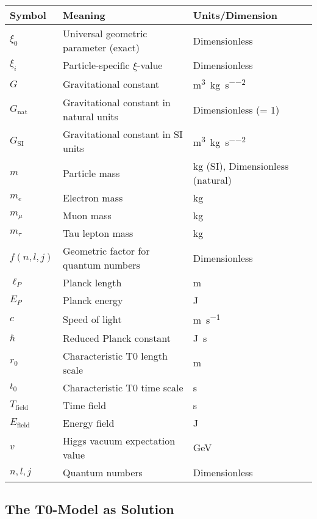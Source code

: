 \documentclass[12pt,a4paper]{article}
\newcommand{\xifunc}{f(n,l,j)}
\newcommand{\Gsi}{G_{\text{SI}}}
\newcommand{\Gnat}{G_{\text{nat}}}
\theoremstyle{definition}
\begin{document}
	\begin{center}
		\begin{tabular}{lll}
			\toprule
			\textbf{Symbol} & \textbf{Meaning} & \textbf{Units/Dimension} \\
			\midrule
			$\xi_0$ & Universal geometric parameter (exact) & Dimensionless \\
			$\xi_i$ & Particle-specific $\xi$-value & Dimensionless \\
			$G$ & Gravitational constant & \si{\metre\cubed\per\kilogram\per\second\squared} \\
			$\Gnat$ & Gravitational constant in natural units & Dimensionless (= 1) \\
			$\Gsi$ & Gravitational constant in SI units & \si{\metre\cubed\per\kilogram\per\second\squared} \\
			$m$ & Particle mass & \si{\kilogram} (SI), Dimensionless (natural) \\
			$m_e$ & Electron mass & \si{\kilogram} \\
			$m_\mu$ & Muon mass & \si{\kilogram} \\
			$m_\tau$ & Tau lepton mass & \si{\kilogram} \\
			$\xifunc$ & Geometric factor for quantum numbers & Dimensionless \\
			$\ell_P$ & Planck length & \si{\metre} \\
			$E_P$ & Planck energy & \si{\joule} \\
			$c$ & Speed of light & \si{\metre\per\second} \\
			$\hbar$ & Reduced Planck constant & \si{\joule\second} \\
			$r_0$ & Characteristic T0 length scale & \si{\metre} \\
			$t_0$ & Characteristic T0 time scale & \si{\second} \\
			$T_{\text{field}}$ & Time field & \si{\second} \\
			$E_{\text{field}}$ & Energy field & \si{\joule} \\
			$v$ & Higgs vacuum expectation value & \si{\giga\electronvolt} \\
			$n,l,j$ & Quantum numbers & Dimensionless \\
			\bottomrule
		\end{tabular}
	\end{center}
	
	\subsection{The T0-Model as Solution}
	
\end{document}
